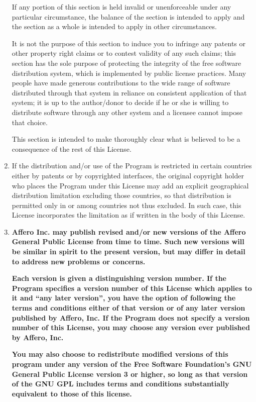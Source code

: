 \documentclass[11pt, letterpaper]{book}
\begin{document}
\begin{enumerate}
If any portion of this section is held invalid or unenforceable under
any particular circumstance, the balance of the section is intended to
apply and the section as a whole is intended to apply in other
circumstances.

It is not the purpose of this section to induce you to infringe any
patents or other property right claims or to contest validity of any
such claims; this section has the sole purpose of protecting the
integrity of the free software distribution system, which is
implemented by public license practices.  Many people have made
generous contributions to the wide range of software distributed
through that system in reliance on consistent application of that
system; it is up to the author/donor to decide if he or she is willing
to distribute software through any other system and a licensee cannot
impose that choice.

This section is intended to make thoroughly clear what is believed to
be a consequence of the rest of this License.

\item
If the distribution and/or use of the Program is restricted in
certain countries either by patents or by copyrighted interfaces, the
original copyright holder who places the Program under this License
may add an explicit geographical distribution limitation excluding
those countries, so that distribution is permitted only in or among
countries not thus excluded.  In such case, this License incorporates
the limitation as if written in the body of this License.

\item
\textbf{Affero Inc. may publish revised and/or new versions of the Affero
General Public License from time to time. Such new versions will be
similar in spirit to the present version, but may differ in detail to
address new problems or concerns.}

\textbf{Each version is given a distinguishing version number. If the Program
specifies a version number of this License which applies to it and
``any later version'', you have the option of following the terms and
conditions either of that version or of any later version published by
Affero, Inc. If the Program does not specify a version number of this
License, you may choose any version ever published by Affero, Inc.}

\textbf{You may also choose to redistribute modified versions of this program
under any version of the Free Software Foundation's GNU General Public
License version 3 or higher, so long as that version of the GNU GPL
includes terms and conditions substantially equivalent to those of
this license.}


\end{enumerate}
\end{document}
